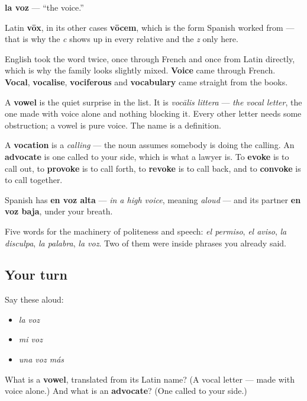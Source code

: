 \begin{cousinweb}
\textbf{la voz} — \textquotedblleft{}the voice.\textquotedblright{}

Latin \textbf{vōx}, in its other cases \textbf{vōcem}, which is the form Spanish worked from — that is why the \emph{c} shows up in every relative and the \emph{z} only here.

English took the word twice, once through French and once from Latin directly, which is why the family looks slightly mixed. \textbf{Voice} came through French. \textbf{Vocal}, \textbf{vocalise}, \textbf{vociferous} and \textbf{vocabulary} came straight from the books.

A \textbf{vowel} is the quiet surprise in the list. It is \emph{vocālis littera} — \emph{the vocal letter}, the one made with voice alone and nothing blocking it. Every other letter needs some obstruction; a vowel is pure voice. The name is a definition.

A \textbf{vocation} is a \emph{calling} — the noun assumes somebody is doing the calling. An \textbf{advocate} is one called to your side, which is what a lawyer is. To \textbf{evoke} is to call out, to \textbf{provoke} is to call forth, to \textbf{revoke} is to call back, and to \textbf{convoke} is to call together.

Spanish has \textbf{en voz alta} — \emph{in a high voice}, meaning \emph{aloud} — and its partner \textbf{en voz baja}, under your breath.
\end{cousinweb}

\begin{grammarlens}[title={What you've built}]
Five words for the machinery of politeness and speech: \emph{el permiso}, \emph{el aviso}, \emph{la disculpa}, \emph{la palabra}, \emph{la voz}. Two of them were inside phrases you already said.
\end{grammarlens}

\subsection*{Your turn}
Say these aloud:

\begin{itemize}
\raggedright
  \item \emph{la voz}
  \item \emph{mi voz}
  \item \emph{una voz más}
\end{itemize}

\begin{tcolorbox}[breakable,colback=teal!4,colframe=teal!35!black,title={Before you move on}]
What is a \textbf{vowel}, translated from its Latin name? (A vocal letter — made with voice alone.) And what is an \textbf{advocate}? (One called to your side.)
\end{tcolorbox}
